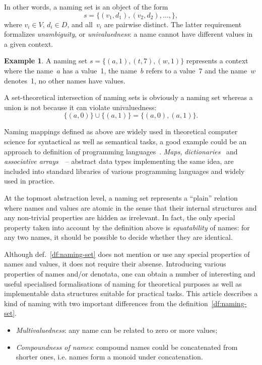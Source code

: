 \documentclass{article}
\theoremstyle{definition}
\newtheorem{Ex}{Example}
\begin{document}
In other words, a naming set is an object of the form
\[
  s = \{ (v_1, d_1), (v_2, d_2), \ldots, \} ,
\]
where $v_i\in V$, $d_i\in D$, and all~$v_i$ are pairwise distinct. The
latter requirement formalizes \emph{unambiguity}, or \emph{univaluedness}: a
name cannot have different values in a given context.

\begin{Ex}\label{ex:naming-set}
A naming set $s = \{ (a, 1), (t, 7), (w, 1) \}$ represents a context where
the name~$a$ has a value~1, the name~$b$ refers to a value~7 and the name~$w$
denotes~1, no other names have values.
\end{Ex}

A set-theoretical intersection  of naming sets is obviously a naming set
whereas a union is not because it can violate univaluedness:
\[
  \{ (a, 0) \} \cup \{ (a, 1) \} = \{ (a, 0), (a, 1) \} .
\]

Naming mappings defined as above are widely used in theoretical computer
science for syntactical as well as semantical tasks, a good example could be
an approach to definition of programming languages~\cite{bib:ollongren}.
\emph{Maps}, \emph{dictionaries}~\cite{bib:dictionary} and \emph{associative
arrays}~\cite{bib:mehlhorn-assoc}~-- abstract data types
implementing the same idea, are included into standard libraries of various
programming languages and widely used in practice.

At the topmost abstraction level, a naming set represents a ``plain'' relation
where names and values are atomic in the sense that their internal structures
and any non-trivial properties are hidden as irrelevant.  In fact, the only
special property taken into account by the definition above is
\emph{equatability} of names: for any two names, it should be possible to
decide whether they are identical.

Although def.~\ref{df:naming-set} does not mention or use any special properties
of names and values, it does not require their absense.
Introducing various properties of names and/or denotata, one can obtain a
number of interesting and useful specialised formalisations of naming for
theoretical purposes as well as implementable data structures suitable for
practical tasks. This article describes a kind of naming with
two important differences from the definition~\ref{df:naming-set}.
\begin{itemize}
\item \emph{Multivaluedness}: any name can be related to zero or more values;
\item \emph{Compoundness of names}: compound names could be concatenated from
shorter ones, i.e. names form a monoid under concatenation.
\end{itemize}
\end{document}
